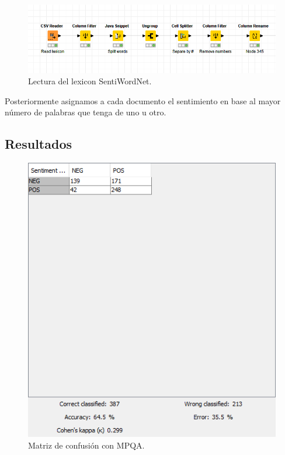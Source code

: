 \begin{figure}[t]
    \center\includegraphics[width=.95\linewidth]{img/analysis/sentiword-reading.png}
    \caption{Lectura del lexicon SentiWordNet.}
\end{figure}

Posteriormente asignamos a cada documento el sentimiento en base al mayor número de palabras que tenga de uno u otro.


\subsection{Resultados}

\begin{figure}[t]
    \center\includegraphics[width=.95\linewidth]{img/analysis/score1.png}
    \caption{Matriz de confusión con MPQA.}
\end{figure}

